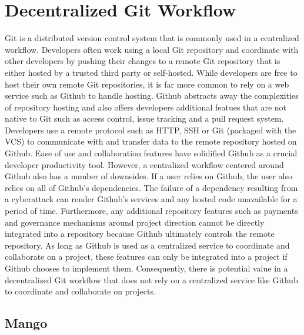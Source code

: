 \section{Decentralized Git Workflow}
\label{sec:git}

Git is a distributed version control system that is commonly used in a
centralized workflow. Developers often work using a local Git repository and
coordinate with other developers by pushing their changes to a remote Git
repository that is either hosted by a trusted third party or self-hosted. While
developers are free to host their own remote Git repositories, it is far more
common to rely on a web service such as Github to handle hosting. Github
abstracts away the complexities of repository hosting and also offers developers
additional featues that are not native to Git such as access control, issue
tracking and a pull request system. Developers use a remote protocol such as
HTTP, SSH or Git (packaged with the VCS) to communicate with and transfer data
to the remote repository hosted on Github\cite{gitprotocol}. Ease of use and collaboration features have
solidified Github as a crucial developer productivity tool. However, a
centralized workflow centered around Github also has a number of downsides. If a
user relies on Github, the user also relies on all of Github's dependencies. The
failure of a dependency resulting from a cyberattack can render
Github's services and any hosted code unavailable for a period of
time\cite{dynddos}. Furthermore, any additional repository features such as
payments and governance mechanisms around project direction cannot be directly
integrated into a repository because Github ultimately controls the
remote repository. As long as Github is used as a centralized service to
coordinate and collaborate on a project, these features can only be integrated
into a project if Github chooses to implement them. Consequently, there is
potential value in a decentralized Git workflow that does not rely on a
centralized service like Github to coordinate and collaborate on projects.

\subsection{Mango}

